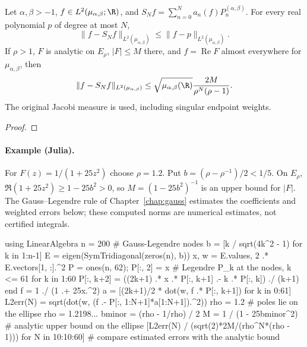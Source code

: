 \begin{theorem}
\label{thm:jacobi-analytic-approximation}
\leanok
Let $\alpha,\beta>-1$, $f\in L^2(\mu_{\alpha,\beta};\R)$, and
$S_Nf=\sum_{n=0}^N a_n(f)P_n^{(\alpha,\beta)}$.
For every real polynomial $p$ of degree at most $N$,
\[
 \|f-S_Nf\|_{L^2(\mu_{\alpha,\beta})}\le
 \|f-p\|_{L^2(\mu_{\alpha,\beta})}.
\]
If $\rho>1$, $F$ is analytic on $E_\rho$, $|F|\le M$ there, and
$f=\operatorname{Re}F$ almost everywhere for $\mu_{\alpha,\beta}$, then
\[
 \|f-S_Nf\|_{L^2(\mu_{\alpha,\beta})}\le
 \sqrt{\mu_{\alpha,\beta}(\R)}\frac{2M}{\rho^N(\rho-1)}.
\]
The original Jacobi measure is used, including singular endpoint weights.
\end{theorem}
\begin{proof}
\leanok
\end{proof}

\paragraph{Example (Julia).} For $F(z)=1/(1+25z^2)$ choose $\rho=1.2$. Put $b=(\rho-\rho^{-1})/2<1/5$. On $E_\rho$, $\Re(1+25z^2)\ge1-25b^2>0$, so $M=(1-25b^2)^{-1}$ is an upper bound for $|F|$. The Gauss--Legendre rule of Chapter~\ref{chap:gauss} estimates the coefficients and weighted errors below; these computed norms are numerical estimates, not certified integrals.

\begin{juliacode}
using LinearAlgebra
n = 200                             # Gauss-Legendre nodes
b = [k / sqrt(4k^2 - 1) for k in 1:n-1]
E = eigen(SymTridiagonal(zeros(n), b))
x, w = E.values, 2 .* E.vectors[1, :].^2
P = ones(n, 62); P[:, 2] = x        # Legendre P_k at the nodes, k <= 61
for k in 1:60
    P[:, k+2] = ((2k+1) .* x .* P[:, k+1] .- k .* P[:, k]) ./ (k+1)
end
f = 1 ./ (1 .+ 25x.^2)
a = [(2k+1)/2 * dot(w, f .* P[:, k+1]) for k in 0:61]
L2err(N) = sqrt(dot(w, (f .- P[:, 1:N+1]*a[1:N+1]).^2))
rho = 1.2                           # poles lie on the ellipse rho = 1.2198...
bminor = (rho - 1/rho) / 2
M = 1 / (1 - 25bminor^2)             # analytic upper bound on the ellipse
[L2err(N) / (sqrt(2)*2M/(rho^N*(rho - 1))) for N in 10:10:60]
                                    # compare estimated errors with the analytic bound
\end{juliacode}

